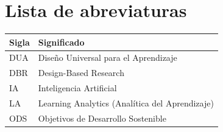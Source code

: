 \chapter*{Lista de abreviaturas}

\begin{tabular}{@{}ll@{}}
\toprule
\textbf{Sigla} & \textbf{Significado} \\
\midrule
DUA & Diseño Universal para el Aprendizaje \\
DBR & Design-Based Research \\
IA  & Inteligencia Artificial \\
LA  & Learning Analytics (Analítica del Aprendizaje) \\
ODS & Objetivos de Desarrollo Sostenible \\
\bottomrule
\end{tabular}

\clearpage